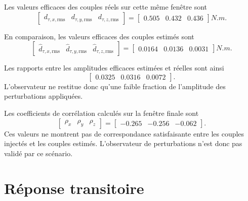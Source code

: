 \documentclass[11pt,a4paper,oneside]{report}
\begin{document}
Les valeurs efficaces des couples réels sur cette même fenêtre sont
\begin{equation}
	\begin{bmatrix}
		d_{\tau,x,\mathrm{rms}} &
		d_{\tau,y,\mathrm{rms}} &
		d_{\tau,z,\mathrm{rms}}
	\end{bmatrix}
	=
	\begin{bmatrix}
		0.505 &
		0.432 &
		0.436
	\end{bmatrix}
	\si{N.m}.
	\label{eq_results_real_disturbance_rms}
\end{equation}

En comparaison, les valeurs efficaces des couples estimés sont
\begin{equation}
	\begin{bmatrix}
		\hat d_{\tau,x,\mathrm{rms}} &
		\hat d_{\tau,y,\mathrm{rms}} &
		\hat d_{\tau,z,\mathrm{rms}}
	\end{bmatrix}
	=
	\begin{bmatrix}
		0.0164 &
		0.0136 &
		0.0031
	\end{bmatrix}
	\si{N.m}.
	\label{eq_results_estimated_disturbance_rms}
\end{equation}

Les rapports entre les amplitudes efficaces estimées et réelles sont ainsi
\begin{equation}
	\begin{bmatrix}
		0.0325 &
		0.0316 &
		0.0072
	\end{bmatrix}.
	\label{eq_results_ndo_amplitude_ratios}
\end{equation}
L'observateur ne restitue donc qu'une faible fraction de l'amplitude des perturbations appliquées.

Les coefficients de corrélation calculés sur la fenêtre finale sont
\begin{equation}
	\begin{bmatrix}
		\rho_x &
		\rho_y &
		\rho_z
	\end{bmatrix}
	=
	\begin{bmatrix}
		-0.265 &
		-0.256 &
		-0.062
	\end{bmatrix}.
	\label{eq_results_ndo_correlations}
\end{equation}
Ces valeurs ne montrent pas de correspondance satisfaisante entre les couples injectés et les couples estimés. L'observateur de perturbations n'est donc pas validé par ce scénario.

\section{Réponse transitoire}
\end{document}
